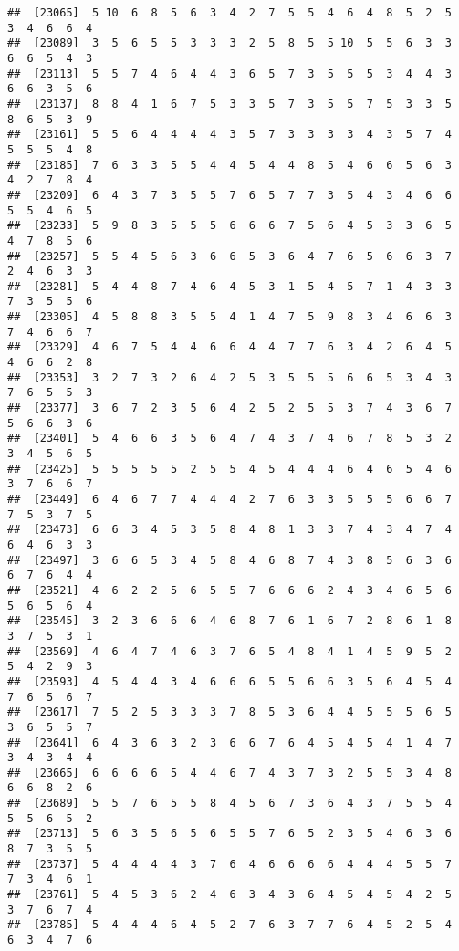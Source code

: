 \documentclass[
]{book}
\begin{document}
\begin{verbatim}
##  [23065]  5 10  6  8  5  6  3  4  2  7  5  5  4  6  4  8  5  2  5  3  4  6  6  4
##  [23089]  3  5  6  5  5  3  3  3  2  5  8  5  5 10  5  5  6  3  3  6  6  5  4  3
##  [23113]  5  5  7  4  6  4  4  3  6  5  7  3  5  5  5  3  4  4  3  6  6  3  5  6
##  [23137]  8  8  4  1  6  7  5  3  3  5  7  3  5  5  7  5  3  3  5  8  6  5  3  9
##  [23161]  5  5  6  4  4  4  4  3  5  7  3  3  3  3  4  3  5  7  4  5  5  5  4  8
##  [23185]  7  6  3  3  5  5  4  4  5  4  4  8  5  4  6  6  5  6  3  4  2  7  8  4
##  [23209]  6  4  3  7  3  5  5  7  6  5  7  7  3  5  4  3  4  6  6  5  5  4  6  5
##  [23233]  5  9  8  3  5  5  5  6  6  6  7  5  6  4  5  3  3  6  5  4  7  8  5  6
##  [23257]  5  5  4  5  6  3  6  6  5  3  6  4  7  6  5  6  6  3  7  2  4  6  3  3
##  [23281]  5  4  4  8  7  4  6  4  5  3  1  5  4  5  7  1  4  3  3  7  3  5  5  6
##  [23305]  4  5  8  8  3  5  5  4  1  4  7  5  9  8  3  4  6  6  3  7  4  6  6  7
##  [23329]  4  6  7  5  4  4  6  6  4  4  7  7  6  3  4  2  6  4  5  4  6  6  2  8
##  [23353]  3  2  7  3  2  6  4  2  5  3  5  5  5  6  6  5  3  4  3  7  6  5  5  3
##  [23377]  3  6  7  2  3  5  6  4  2  5  2  5  5  3  7  4  3  6  7  5  6  6  3  6
##  [23401]  5  4  6  6  3  5  6  4  7  4  3  7  4  6  7  8  5  3  2  3  4  5  6  5
##  [23425]  5  5  5  5  5  2  5  5  4  5  4  4  4  6  4  6  5  4  6  3  7  6  6  7
##  [23449]  6  4  6  7  7  4  4  4  2  7  6  3  3  5  5  5  6  6  7  7  5  3  7  5
##  [23473]  6  6  3  4  5  3  5  8  4  8  1  3  3  7  4  3  4  7  4  6  4  6  3  3
##  [23497]  3  6  6  5  3  4  5  8  4  6  8  7  4  3  8  5  6  3  6  6  7  6  4  4
##  [23521]  4  6  2  2  5  6  5  5  7  6  6  6  2  4  3  4  6  5  6  5  6  5  6  4
##  [23545]  3  2  3  6  6  6  4  6  8  7  6  1  6  7  2  8  6  1  8  3  7  5  3  1
##  [23569]  4  6  4  7  4  6  3  7  6  5  4  8  4  1  4  5  9  5  2  5  4  2  9  3
##  [23593]  4  5  4  4  3  4  6  6  6  5  5  6  6  3  5  6  4  5  4  7  6  5  6  7
##  [23617]  7  5  2  5  3  3  3  7  8  5  3  6  4  4  5  5  5  6  5  3  6  5  5  7
##  [23641]  6  4  3  6  3  2  3  6  6  7  6  4  5  4  5  4  1  4  7  3  4  3  4  4
##  [23665]  6  6  6  6  5  4  4  6  7  4  3  7  3  2  5  5  3  4  8  6  6  8  2  6
##  [23689]  5  5  7  6  5  5  8  4  5  6  7  3  6  4  3  7  5  5  4  5  5  6  5  2
##  [23713]  5  6  3  5  6  5  6  5  5  7  6  5  2  3  5  4  6  3  6  8  7  3  5  5
##  [23737]  5  4  4  4  4  3  7  6  4  6  6  6  6  4  4  4  5  5  7  7  3  4  6  1
##  [23761]  5  4  5  3  6  2  4  6  3  4  3  6  4  5  4  5  4  2  5  3  7  6  7  4
##  [23785]  5  4  4  4  6  4  5  2  7  6  3  7  7  6  4  5  2  5  4  6  3  4  7  6

\end{verbatim}
\end{document}
